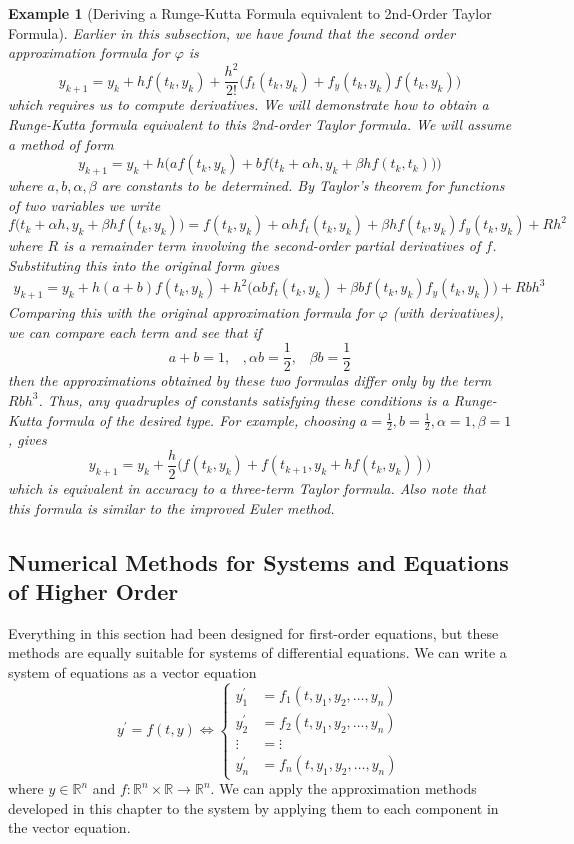 \documentclass{article}
\newtheorem{example}{Example}[section]
\theoremstyle{remark}
\theoremstyle{definition}
\begin{document}
\begin{example}[Deriving a Runge-Kutta Formula equivalent to 2nd-Order Taylor Formula]
Earlier in this subsection, we have found that the second order approximation formula for $\varphi$ is 
\[y_{k+1} = y_k + h f(t_k, y_k) + \frac{h^2}{2!} \big( f_t (t_k, y_k) + f_y (t_k, y_k) f(t_k, y_k)\big)\]
which requires us to compute derivatives. We will demonstrate how to obtain a Runge-Kutta formula equivalent to this 2nd-order Taylor formula. We will assume a method of form 
\[y_{k+1} = y_k + h \Big( af(t_k, y_k) + b f\big( t_k + \alpha h, y_k + \beta h f(t_k, t_k)\big)\Big)\]
where $a, b, \alpha, \beta$ are constants to be determined. By Taylor's theorem for functions of two variables we write
\[f\big(t_k + \alpha h, y_k + \beta h f(t_k, y_k)\big) = f(t_k, y_k) + \alpha h f_t (t_k, y_k) + \beta h f(t_k, y_k) f_y (t_k, y_k) + R h^2\]
where $R$ is a remainder term involving the second-order partial derivatives of $f$. Substituting this into the original form gives
\begin{align*}
    y_{k+1} = y_k + h(a + b) f(t_k, y_k) + h^2 \big( \alpha b f_t (t_k, y_k) + \beta b f(t_k, y_k) f_y (t_k, y_k)\big) + R b h^3
\end{align*}
Comparing this with the original approximation formula for $\varphi$ (with derivatives), we can compare each term and see that if
\[a + b = 1, \;\;\;, \alpha b = \frac{1}{2}, \;\;\; \beta b = \frac{1}{2}\]
then the approximations obtained by these two formulas differ only by the term $R b h^3$. Thus, any quadruples of constants satisfying these conditions is a Runge-Kutta formula of the desired type. For example, choosing $a = \frac{1}{2}, b = \frac{1}{2}, \alpha = 1, \beta = 1$, gives
\[y_{k+1} = y_k + \frac{h}{2} \big( f(t_k, y_k) + f(t_{k+1}, y_k + h f(t_k, y_k))\big)\]
which is equivalent in accuracy to a three-term Taylor formula. Also note that this formula is similar to the improved Euler method. 
\end{example}

\subsection{Numerical Methods for Systems and Equations of Higher Order}
Everything in this section had been designed for first-order equations, but these methods are equally suitable for systems of differential equations. We can write a system of equations as a vector equation
\[y^\prime = f(t, y) \iff \begin{cases}
y_1^\prime & = f_1 (t, y_1, y_2, \ldots, y_n) \\
y_2^\prime & = f_2 (t, y_1, y_2, \ldots, y_n) \\
\vdots & = \vdots \\
y_n^\prime & = f_n (t, y_1, y_2, \ldots, y_n)
\end{cases}\]
where $y \in \mathbb{R}^n$ and $f: \mathbb{R}^n \times \mathbb{R} \longrightarrow \mathbb{R}^n$. We can apply the approximation methods developed in this chapter to the system by applying them to each component in the vector equation. 
\end{document}
